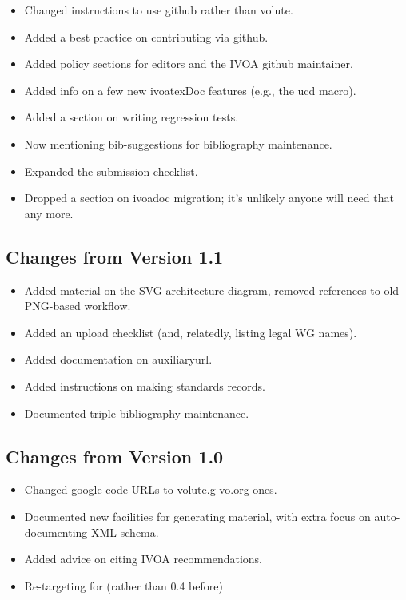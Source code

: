 \documentclass[11pt,a4paper]{ivoa}
\begin{document}
\begin{itemize}
\item Changed instructions to use github rather than volute.
\item Added a best practice on contributing via github.
\item Added policy sections for editors and the IVOA github maintainer.
\item Added info on a few new ivoatexDoc features (e.g., the ucd macro).
\item Added a section on writing regression tests.
\item Now mentioning bib-suggestions for bibliography maintenance.
\item Expanded the submission checklist.
\item Dropped a section on ivoadoc migration; it's unlikely anyone
will need that any more.
\end{itemize}

\subsection{Changes from Version 1.1}

\begin{itemize}
\item Added material on the SVG architecture diagram, removed references
to old PNG-based workflow.
\item Added an upload checklist (and, relatedly, listing legal WG names).
\item Added documentation on auxiliaryurl.
\item Added instructions on making standards records.
\item Documented triple-bibliography maintenance.
\end{itemize}

\subsection{Changes from Version 1.0}
\begin{itemize}
\item Changed google code URLs to volute.g-vo.org ones.
\item Documented new facilities for generating material, with extra
focus on auto-documenting XML schema.
\item Added advice on citing IVOA recommendations.
\item Re-targeting for  (rather than 0.4 before)
\end{itemize}



\end{document}
